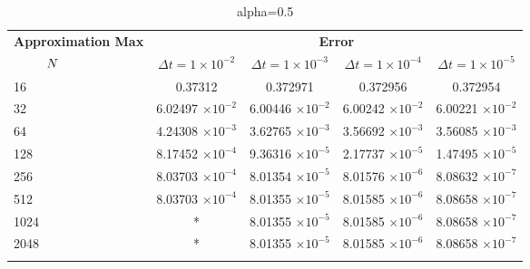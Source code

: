 \begin{table}
	\begin{tabular}{lcccc}
		\toprule
		\multicolumn{1}{c}{\textbf{Approximation Max}} & \multicolumn{4}{c}{\textbf{Error}} \\
		$\hspace{9mm}N$ & $\Delta t=1\times 10^{-2}$ & $\Delta t=1\times 10^{-3}$ & $\Delta t=1\times 10^{-4}$ & $\Delta t=1\times 10^{-5}$ \\
		\midrule
		\hspace{7mm} 16 & 0.37312     & 0.372971    & 0.372956    & 0.372954    \\
		\midrule
		\hspace{7mm} 32 & 6.02497 $\times 10 ^{-2}$   & 6.00446 $\times 10 ^{-2}$   & 6.00242 $\times 10 ^{-2}$  & 6.00221 $\times 10 ^{-2}$  \\
		\midrule
		\hspace{7mm} 64 & 4.24308 $\times 10 ^{-3}$  & 3.62765 $\times 10 ^{-3}$  & 3.56692 $\times 10 ^{-3}$ & 3.56085 $\times 10 ^{-3}$  \\
		\midrule
		\hspace{7mm} 128 & 8.17452 $\times 10 ^{-4}$ & 9.36316 $\times 10 ^{-5}$ & 2.17737 $\times 10 ^{-5}$ & 1.47495 $\times 10 ^{-5}$ \\
		\midrule
		\hspace{7mm} 256 & 8.03703 $\times 10 ^{-4}$ & 8.01354 $\times 10 ^{-5}$ & 8.01576 $\times 10 ^{-6}$ & 8.08632 $\times 10 ^{-7}$ \\
		\midrule
		\hspace{7mm} 512 & 8.03703 $\times 10 ^{-4}$ & 8.01355 $\times 10 ^{-5}$ & 8.01585 $\times 10 ^{-6}$ & 8.08658 $\times 10 ^{-7}$ \\
		\midrule
		\hspace{7mm} 1024 & * & 8.01355 $\times 10 ^{-5}$ & 8.01585 $\times 10 ^{-6}$ & 8.08658 $\times 10 ^{-7}$ \\
		\midrule
		\hspace{7mm} 2048 & * & 8.01355 $\times 10 ^{-5}$ & 8.01585 $\times 10 ^{-6}$ & 8.08658 $\times 10 ^{-7}$ \\
		\\
		\bottomrule
	\end{tabular}
	\caption{alpha=0.5}
\end{table}	

